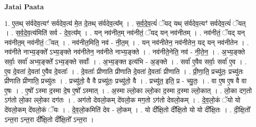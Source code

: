 \documentclass[17pt]{extarticle}
\begin{document}
\textbf{Jatai Paata} \newline

1. ए॒तथ् स॑र्वदेव॒त्यꣳ॑ सर्वदेव॒त्य॑ मे॒त दे॒तथ् स॑र्वदेव॒त्य᳚म् । . स॒र्व॒दे॒व॒त्यं॑ ॅयद् यथ् स॑र्वदेव॒त्यꣳ॑ सर्वदेव॒त्यं॑ ॅयत् । . स॒र्व॒दे॒व॒त्य॑मिति॑ सर्व - दे॒व॒त्य᳚म् । . यन् नव॑नीत॒म् नव॑नीतं॒ ॅयद् यन् नव॑नीतम् । . नव॑नीतं॒ ॅयद् यन् नव॑नीत॒म् नव॑नीतं॒ ॅयत् । . नव॑नीत॒मिति॒ नव॑ - नी॒त॒म् । . यन् नव॑नीतेन॒ नव॑नीतेन॒ यद् यन् नव॑नीतेन । . नव॑नीते नाभ्य॒ङ्क्ते᳚ ऽभ्य॒ङ्क्ते नव॑नीतेन॒ नव॑नीते नाभ्य॒ङ्क्ते । . नव॑नीते॒नेति॒ नव॑ - नी॒ते॒न॒ । . अ॒भ्य॒ङ्क्ते सर्वाः॒ सर्वा॑ अभ्य॒ङ्क्ते᳚ ऽभ्य॒ङ्क्ते सर्वाः᳚ । . अ॒भ्य॒ङ्क्त इत्य॑भि - अ॒ङ्क्ते । . सर्वा॑ ए॒वैव सर्वाः॒ सर्वा॑ ए॒व । . ए॒व दे॒वता॑ दे॒वता॑ ए॒वैव दे॒वताः᳚ । . दे॒वताः᳚ प्रीणाति प्रीणाति दे॒वता॑ दे॒वताः᳚ प्रीणाति । . प्री॒णा॒ति॒ प्रच्यु॑तः॒ प्रच्यु॑तः प्रीणाति प्रीणाति॒ प्रच्यु॑तः । . प्रच्यु॑तो॒ वै वै प्रच्यु॑तः॒ प्रच्यु॑तो॒ वै । . प्रच्यु॑त॒ इति॒ प्र - च्यु॒तः॒ । . वा ए॒ष ए॒ष वै वा ए॒षः । . ए॒षो᳚ ऽस्मा द॒स्मा दे॒ष ए॒षो᳚ ऽस्मात् । . अ॒स्मा ल्लो॒का ल्लो॒का द॒स्मा द॒स्मा ल्लो॒कात् । . लो॒का दग॒तो ऽग॑तो लो॒का ल्लो॒का दग॑तः । . अग॑तो देवलो॒कम् दे॑वलो॒क मग॒तो ऽग॑तो देवलो॒कम् । . दे॒व॒लो॒कं ॅयो यो दे॑वलो॒कम् दे॑वलो॒कं ॅयः । . दे॒व॒लो॒कमिति॑ देव - लो॒कम् । . यो दी᳚क्षि॒तो दी᳚क्षि॒तो यो यो दी᳚क्षि॒तः । . दी॒क्षि॒तो᳚ ऽन्त॒रा ऽन्त॒रा दी᳚क्षि॒तो दी᳚क्षि॒तो᳚ ऽन्त॒रा । \newline
\end{document}
